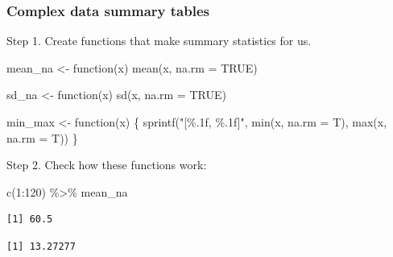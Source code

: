 \documentclass[
  letterpaper,
  DIV=11,
  numbers=noendperiod]{scrartcl}
\newenvironment{Shaded}{\begin{snugshade}}{\end{snugshade}}
\newcommand{\AttributeTok}[1]{\textcolor[rgb]{0.40,0.45,0.13}{#1}}
\newcommand{\ConstantTok}[1]{\textcolor[rgb]{0.56,0.35,0.01}{#1}}
\newcommand{\ControlFlowTok}[1]{\textcolor[rgb]{0.00,0.23,0.31}{#1}}
\newcommand{\DecValTok}[1]{\textcolor[rgb]{0.68,0.00,0.00}{#1}}
\newcommand{\FunctionTok}[1]{\textcolor[rgb]{0.28,0.35,0.67}{#1}}
\newcommand{\NormalTok}[1]{\textcolor[rgb]{0.00,0.23,0.31}{#1}}
\newcommand{\OtherTok}[1]{\textcolor[rgb]{0.00,0.23,0.31}{#1}}
\newcommand{\SpecialCharTok}[1]{\textcolor[rgb]{0.37,0.37,0.37}{#1}}
\newcommand{\StringTok}[1]{\textcolor[rgb]{0.13,0.47,0.30}{#1}}
\begin{document}
\hypertarget{complex-data-summary-tables}{%
\subsubsection{Complex data summary
tables}\label{complex-data-summary-tables}}

Step 1. Create functions that make summary statistics for us.

\begin{Shaded}
\begin{Highlighting}[]
\NormalTok{mean\_na }\OtherTok{\textless{}{-}} \ControlFlowTok{function}\NormalTok{(x) }\FunctionTok{mean}\NormalTok{(x, }\AttributeTok{na.rm =} \ConstantTok{TRUE}\NormalTok{)}

\NormalTok{sd\_na }\OtherTok{\textless{}{-}} \ControlFlowTok{function}\NormalTok{(x) }\FunctionTok{sd}\NormalTok{(x, }\AttributeTok{na.rm =} \ConstantTok{TRUE}\NormalTok{)}

\NormalTok{min\_max }\OtherTok{\textless{}{-}}
  \ControlFlowTok{function}\NormalTok{(x)  \{}
    \FunctionTok{sprintf}\NormalTok{(}\StringTok{"[\%.1f, \%.1f]"}\NormalTok{, }\FunctionTok{min}\NormalTok{(x, }\AttributeTok{na.rm =}\NormalTok{ T), }\FunctionTok{max}\NormalTok{(x, }\AttributeTok{na.rm =}\NormalTok{ T))}
\NormalTok{  \}}
\end{Highlighting}
\end{Shaded}

Step 2. Check how these functions work:

\begin{Shaded}
\begin{Highlighting}[]
\FunctionTok{c}\NormalTok{(}\DecValTok{1}\SpecialCharTok{:}\DecValTok{120}\NormalTok{) }\SpecialCharTok{\%\textgreater{}\%}\NormalTok{ mean\_na}
\end{Highlighting}
\end{Shaded}

\begin{verbatim}
[1] 60.5
\end{verbatim}

\begin{Shaded}
\end{Shaded}

\begin{verbatim}
[1] 13.27277
\end{verbatim}
\end{document}
